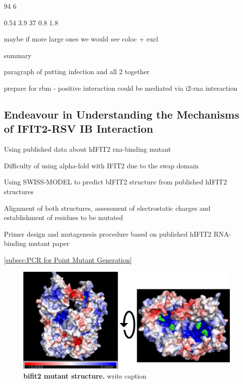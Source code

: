 94 6

0.54 3.9 37
0.8 1.8

maybe if more large ones we would see coloc + excl

summary

paragraph of putting infection and all 2 together

prepare for rbm - positive interaction could be mediated via i2-rna interaction

\subsection{Endeavour in Understanding the Mechanisms of IFIT2-RSV IB Interaction} \label{subsec:Endeavour in Understanding the Mechanisms of IFIT2-RSV IB Interaction}
Using published data about hIFIT2 rna-binding mutant

Difficulty of using alpha-fold with IFIT2 due to the swap domain

Using SWISS-MODEL to predict bIFIT2 structure from published hIFIT2 structures

Alignment of both structures, assessment of electrostatic charges and establishment of residues to be mutated

Primer design and mutagenesis procedure based on published hIFIT2 RNA-binding mutant paper
\cite{Tran2020InfluenzaMRNAs}

\ref{subsec:PCR for Point Mutant Generation}

\begin{figure}
    \centering
    \includegraphics[width=1\linewidth]{09. Chapter 4/Figs/01. pIB/03. IFIT2/05. IFIT2-RNA binding mutant/01. Structure/01. structure.png}
    \caption[ifit2 mutant structure]{\textbf{bifit2 mutant structure.} write caption}
    \label{fig:ifit2 mutant structure}
\end{figure}






